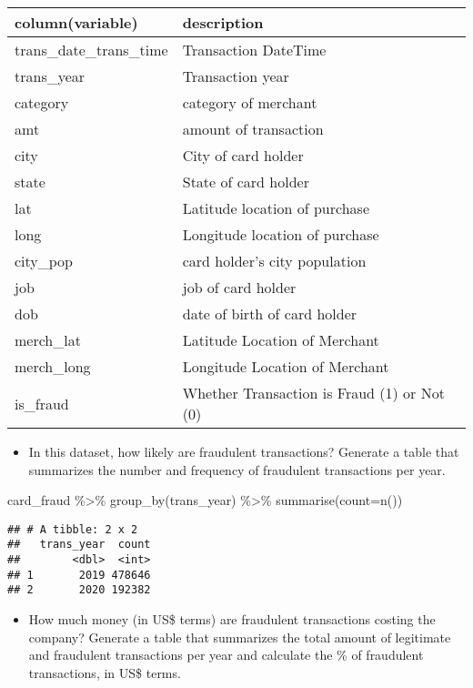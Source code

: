 \documentclass[
]{article}
\newenvironment{Shaded}{\begin{snugshade}}{\end{snugshade}}
\newcommand{\AttributeTok}[1]{\textcolor[rgb]{0.77,0.63,0.00}{#1}}
\newcommand{\FunctionTok}[1]{\textcolor[rgb]{0.00,0.00,0.00}{#1}}
\newcommand{\NormalTok}[1]{#1}
\newcommand{\SpecialCharTok}[1]{\textcolor[rgb]{0.00,0.00,0.00}{#1}}
\providecommand{\tightlist}{%
  \setlength{\itemsep}{0pt}\setlength{\parskip}{0pt}}
\begin{document}
\begin{longtable}[]{@{}ll@{}}
\toprule()
column(variable) & description \\
\midrule()
\endhead
trans\_date\_trans\_time & Transaction DateTime \\
trans\_year & Transaction year \\
category & category of merchant \\
amt & amount of transaction \\
city & City of card holder \\
state & State of card holder \\
lat & Latitude location of purchase \\
long & Longitude location of purchase \\
city\_pop & card holder's city population \\
job & job of card holder \\
dob & date of birth of card holder \\
merch\_lat & Latitude Location of Merchant \\
merch\_long & Longitude Location of Merchant \\
is\_fraud & Whether Transaction is Fraud (1) or Not (0) \\
\bottomrule()
\end{longtable}

\begin{itemize}
\tightlist
\item
  In this dataset, how likely are fraudulent transactions? Generate a
  table that summarizes the number and frequency of fraudulent
  transactions per year.
\end{itemize}

\begin{Shaded}
\begin{Highlighting}[]
\NormalTok{card\_fraud }\SpecialCharTok{\%\textgreater{}\%}
  \FunctionTok{group\_by}\NormalTok{(trans\_year) }\SpecialCharTok{\%\textgreater{}\%} 
  \FunctionTok{summarise}\NormalTok{(}\AttributeTok{count=}\FunctionTok{n}\NormalTok{())}
\end{Highlighting}
\end{Shaded}

\begin{verbatim}
## # A tibble: 2 x 2
##   trans_year  count
##        <dbl>  <int>
## 1       2019 478646
## 2       2020 192382
\end{verbatim}

\begin{itemize}
\tightlist
\item
  How much money (in US\$ terms) are fraudulent transactions costing the
  company? Generate a table that summarizes the total amount of
  legitimate and fraudulent transactions per year and calculate the \%
  of fraudulent transactions, in US\$ terms.
\end{itemize}
\end{document}
